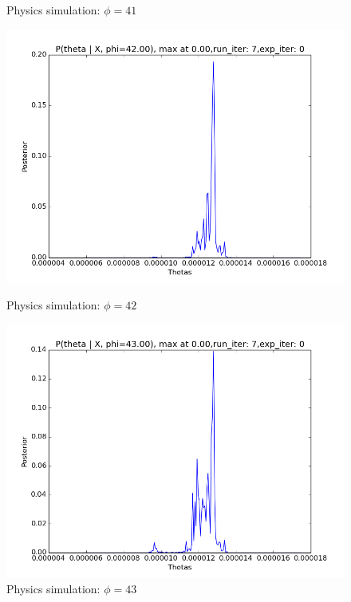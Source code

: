 \documentclass[10pt,journal,compsoc]{IEEEtran}
\begin{document}
\begin{figure}
\begin{minipage}[b]{0.5\linewidth}
\caption{\label{fig:LP1}Physics simulation: $\phi=41$}
\end{minipage} 
\begin{minipage}[b]{0.5\linewidth}
\centering
\includegraphics[width=1\linewidth]{PhysicsPlots/LP2.png} 
\caption{\label{fig:LP2}Physics simulation: $\phi=42$}
\end{minipage}%
\begin{minipage}[b]{0.5\linewidth}
\centering
\includegraphics[width=1\linewidth]{PhysicsPlots/LP3.png} 
\caption{\label{fig:LP3}Physics simulation: $\phi=43$}
\end{minipage} 

\end{figure}
\end{document}
